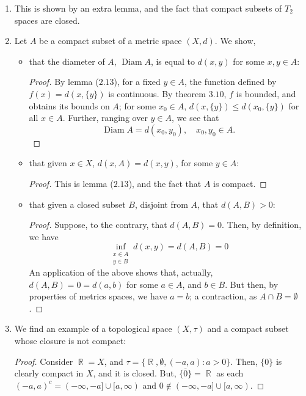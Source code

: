 \documentclass{book}
\DeclareMathOperator*{\R}{\mathbb{R}}
\DeclareMathOperator*{\Diam}{\text{Diam}}
\begin{document}
\begin{enumerate}[(1)]
    \item This is shown by an extra lemma, and the fact that compact subsets of $T_2$ spaces are closed.

    \item Let $A$ be a compact subset of a metric space $(X,d)$. We show, 
        \begin{itemize}
            \item that the diameter of $A$, $\Diam A$, is equal to $d(x,y)$ for some $x,y \in A$: 
                \begin{proof} By lemma ($2.13$), for a fixed $y \in A$, the function defined by $f(x) = d(x, \{y\})$ is continuous. By theorem $3.10$, $f$ is bounded, and obtains its bounds on $A$; for some $x_0 \in A$, $d(x, \{y\}) \leq d(x_0, \{y\})$ for all $x \in A$.  Further, ranging over $y \in A$, we see that 
                    \[\Diam A = d(x_0, y_0), \quad x_0, y_0 \in A.\]
                \end{proof}
            \item that given $x \in X$, $d(x,A) = d(x,y)$, for some $y \in A$: 
                \begin{proof} This is lemma ($2.13$), and the fact that $A$ is compact. 
                \end{proof}
            \item that given a closed subset $B$, disjoint from $A$, that $d(A,B) > 0$: 
                \begin{proof} Suppose, to the contrary, that $d(A,B) = 0$. Then, by definition, we have 
                    \[\inf_{\substack{x \in A \\ y \in B}} d(x, y) = d(A,B) = 0\]
                    An application of the above shows that, actually, $d(A,B) = 0 = d(a,b)$ for some $a \in A$, and $b \in B$. But then, by properties of metrics spaces, we have $a = b$; a contraction, as $A \cap B = \emptyset$. 
                \end{proof}
        \end{itemize}

    \item We find an example of a topological space $(X, \tau)$ and a compact subset whose closure is not compact: 
        \begin{proof} Consider $\R = X$, and $\tau = \{\R, \emptyset, (-a,a) : a > 0\}$. Then, $\{0\}$ is clearly compact in $X$, and it is closed. But, $\overline{\{0\}} = \R$ as each $(-a, a)^c = (-\infty, -a] \cup [a, \infty)$ and $0 \notin (-\infty, -a] \cup [a, \infty)$. 
        \end{proof}


\end{enumerate}
\end{document}
